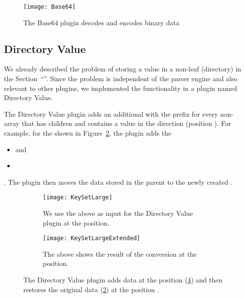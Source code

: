 \begin{figure}
  \centering
    \texttt{[image: Base64]}
  \caption{The Base64 plugin decodes and encodes binary data}
  \label{fig:base64}
\end{figure}

\subsection{Directory Value}

We already described the problem of storing a value in a non-leaf (directory)  in the Section~“”. Since the problem is independent of the parser engine and also relevant to other plugins, we implemented the functionality in a plugin named Directory Value.

The Directory Value plugin adds an additional  with the prefix  for every non-array  that has children and contains a value in the  direction (position ). For example, for the  shown in Figure~\ref{fig:keyset_large}, the plugin adds the 

\begin{itemize}
  \item {} and
  \item {}
\end{itemize}

. The plugin then moves the data stored in the parent  to the newly created .

\begin{figure}[H]
  \centering
  \begin{subfigure}[t]{.4\textwidth}
    \texttt{[image: KeySetLarge]}
    \caption{We use the  above as input for the Directory Value plugin at the  position.}
    \label{fig:keyset_large}
  \end{subfigure}
  \qquad
  \begin{subfigure}[t]{.48\textwidth}
    \texttt{[image: KeySetLargeExtended]}
    \caption{The  above shows the result of the conversion at the  position.}
    \label{fig:keyset_large_extended}
  \end{subfigure}
  \caption{The Directory Value plugin adds data at the position  (\ref{fig:keyset_large_extended}) and then restores the original data (\ref{fig:keyset_large}) at the position .}
\end{figure}

